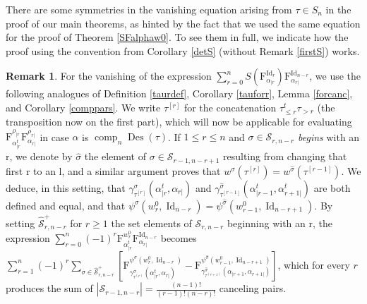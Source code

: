 \documentclass{article}
\theoremstyle{definition}
\newtheorem{rmk}[thm]{Remark}
\begin{document}
\medskip

There are some symmetries in the vanishing equation arising from $\tau \in S_{n}$ in the proof of our main theorems, as hinted by the fact that we used the same equation for the proof of Theorem \ref{SFalphaw0}. To see them in full, we indicate how the proof using the convention from Corollary \ref{detS} (without Remark \ref{firstS}) works.
\begin{rmk}
For the vanishing of the expression $\sum_{r=0}^{n}S(\mathrm{F}_{\alpha_{|r}}^{\operatorname{Id}_{r}})\mathrm{F}_{\alpha_{r|}}^{\operatorname{Id}_{n-r}}$, we use the following analogues of Definition \ref{taurdef}, Corollary \ref{tauforr}, Lemma \ref{forcanc}, and Corollary \ref{comppars}. We write $\tau^{[r]}$ for the concatenation $\tau_{\leq r}^{t}\tau_{>r}$ (the transposition now on the first part), which will now be applicable for evaluating $\mathrm{F}_{\alpha_{|r}^{t}}^{\rho_{|r}}\mathrm{F}_{\alpha_{r|}}^{\rho_{r|}}$ in case $\alpha$ is $\operatorname{comp}_{n}\operatorname{Des}(\tau)$. If $1 \leq r \leq n$ and $\sigma\in\mathcal{S}_{r,n-r}$ \emph{begins} with an r, we denote by $\hat{\sigma}$ the element of $\sigma\in\mathcal{S}_{r-1,n-r+1}$ resulting from changing that first r to an l, and a similar argument proves that $w^{\sigma}(\tau^{[r]})=w^{\hat{\sigma}}(\tau^{[r-1]})$. We deduce, in this setting, that $\gamma^{\sigma}_{\tau^{[r]}}(\alpha_{|r}^{t},\alpha_{r|})$ and $\gamma^{\hat{\sigma}}_{\tau^{[r-1]}}(\alpha_{|r-1}^{t},\alpha_{r+1|}^{t})$ are both defined and equal, and that $\psi^{\sigma}(w^{0}_{r},\operatorname{Id}_{n-r})=\psi^{\hat{\sigma}}(w^{0}_{r-1},\operatorname{Id}_{n-r+1})$. By setting $\hat{\mathcal{S}}_{r,n-r}^{+}$ for $r\geq1$ the set elements of $\mathcal{S}_{r,n-r}$ beginning with an r, the expression $\sum_{r=0}^{n}(-1)^{r}\mathrm{F}_{\alpha_{|r}^{t}}^{w^{0}_{r}}\mathrm{F}_{\alpha_{r|}}^{\operatorname{Id}_{n-r}}$ becomes $\sum_{r=1}^{n}(-1)^{r} \sum_{\sigma\in\hat{\mathcal{S}}_{r,n-r}^{+}}[\mathrm{F}_{\gamma^{\sigma}_{\tau^{(r)}}(\alpha_{|r}^{t},\alpha_{r|})}^{\psi^{\sigma}(w^{0}_{r},\operatorname{Id}_{n-r})}- \mathrm{F}_{\gamma^{\hat{\sigma}}_{\tau^{(r+1)}}(\alpha_{|r+1},\alpha_{r+1|})}^{\psi^{\hat{\sigma}}(w^{0}_{r-1},\operatorname{Id}_{n-r+1})}]$, which for every $r$ produces the sum of $|\mathcal{S}_{r-1,n-r}|=\frac{(n-1)!}{(r-1)!(n-r)!}$ canceling pairs. \label{altproof}
\end{rmk}
\end{document}
